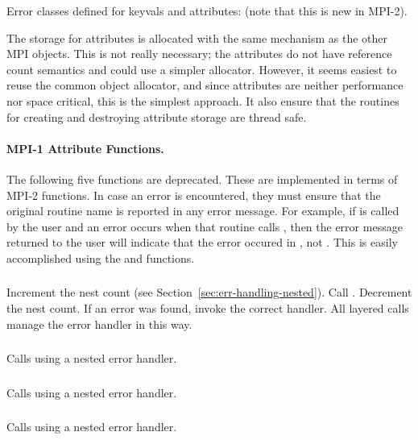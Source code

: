 \documentclass{article}
\begin{document}
Error classes defined for keyvals and attributes:
 (note that this is new in MPI-2).

The storage for attributes is allocated with the same mechanism as the
other MPI objects.  This is not really necessary; the attributes do
not have reference count semantics and could use a simpler allocator.
However, it seems easiest to reuse the common object allocator, and
since attributes are neither performance nor space critical, this is
the simplest approach.  It also ensure that the routines for creating
and destroying attribute storage are thread safe.

\paragraph{MPI-1 Attribute Functions.}
The following five functions are deprecated.  These are implemented in
terms of MPI-2 functions.  In case an error is encountered, they must 
ensure that the original routine name is reported in any error
message.  For example, if  is called by the
user and an error occurs when that routine calls
, then the error message returned to the
user will indicate that the error occured in , not
.  This is easily accomplished using the
 and  functions.

\subsubsection{}
Increment the nest count (see
Section~\ref{sec:err-handling-nested}).
Call .
Decrement the nest count.  
If an error was found, invoke the correct handler.
All layered calls manage the error handler in this way.

\subsubsection{}
Calls  using a nested error handler.

\subsubsection{}
Calls  using a nested error handler.

\subsubsection{}
Calls  using a nested error handler.
\end{document}
